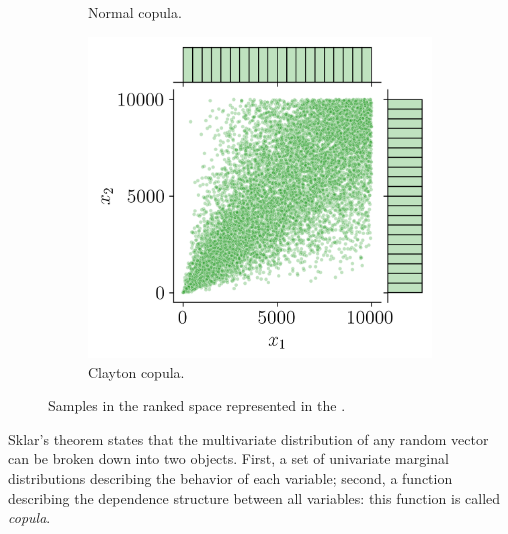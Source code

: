 \begin{figure}
\begin{subfigure}[b]{0.32\textwidth}
        \caption{Normal copula.}
    \end{subfigure}
    \hfill
    \begin{subfigure}[b]{0.32\textwidth}
        \centering
        \includegraphics[width=\textwidth]{../numerical_experiments/chapter1/figures/clayton_copula_ranked.png}
        \caption{Clayton copula.}
    \end{subfigure}
       \caption{Samples in the ranked space represented in the .}
       \label{fig:ranked_joint_dist_samples}
\end{figure}

Sklar's theorem \citep{sklar_1959} states that the multivariate distribution of any random vector can be broken down into two objects. 
First, a set of univariate marginal distributions describing the behavior of each variable; 
second, a function describing the dependence structure between all variables: this function is called \textit{copula}. 

